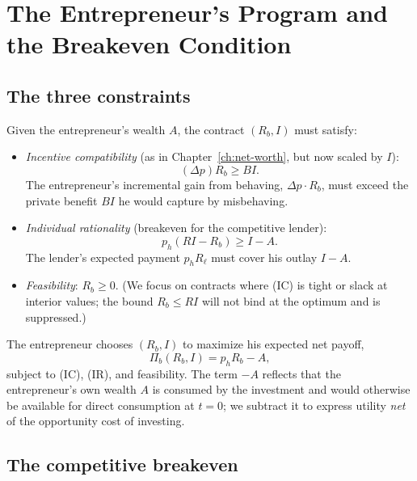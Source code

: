 \documentclass[11pt,a4paper,oneside]{book}
\def\leq{\leqslant}
\def\geq{\geqslant}
\theoremstyle{plain}
\theoremstyle{definition}
\theoremstyle{remark}
\numberwithin{equation}{chapter}
\begin{document}
\section{The Entrepreneur's Program and the Breakeven Condition}
\label{sec:EM-program}

\subsection{The three constraints}

Given the entrepreneur's wealth $A$, the contract $(R_b, I)$ must satisfy:

\begin{itemize}
  \item \emph{Incentive compatibility} (as in Chapter~\ref{ch:net-worth}, but now scaled by $I$):
  \begin{equation}\label{eq:EM-IC}
    (\Delta p) R_b \geq B I.
    \tag{IC}
  \end{equation}
  The entrepreneur's incremental gain from behaving, $\Delta p \cdot R_b$, must exceed the private benefit $B I$ he would capture by misbehaving.
  \item \emph{Individual rationality} (breakeven for the competitive lender):
  \begin{equation}\label{eq:EM-IR}
    p_h (R I - R_b) \geq I - A.
    \tag{IR}
  \end{equation}
  The lender's expected payment $p_h R_\ell$ must cover his outlay $I - A$.
  \item \emph{Feasibility}: $R_b \geq 0$.
  (We focus on contracts where (IC) is tight or slack at interior values; the bound $R_b \leq R I$ will not bind at the optimum and is suppressed.)
\end{itemize}

The entrepreneur chooses $(R_b, I)$ to maximize his expected net payoff,
\begin{equation}\label{eq:EM-objective}
  \Pi_b(R_b, I) = p_h R_b - A,
\end{equation}
subject to (IC), (IR), and feasibility.
The term $-A$ reflects that the entrepreneur's own wealth $A$ is consumed by the investment and would otherwise be available for direct consumption at $t=0$; we subtract it to express utility \emph{net} of the opportunity cost of investing.

\subsection{The competitive breakeven}
\end{document}
